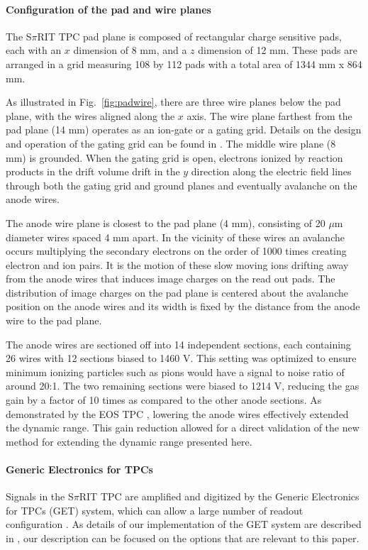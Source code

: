 \documentclass[review]{elsarticle}
\begin{document}
\paragraph{Configuration of the pad and wire planes} 
The S$\pi$RIT TPC pad plane is composed of rectangular charge sensitive pads, each with an $x$ dimension of 8 mm, and a $z$ dimension of 12 mm. These pads are arranged in a grid measuring 108 by 112 pads with a total area of 1344 mm x 864 mm.

As illustrated in Fig.~\ref{fig:padwire}, there are three wire planes below the pad plane, with the wires aligned along the $x$ axis. The wire plane farthest from the pad plane (14 mm) operates as an ion-gate or a gating grid. Details on the design and operation of the gating grid can be found in \cite{suwat}. The middle wire plane (8~ mm) is grounded. When the gating grid is open, electrons ionized by reaction products in the drift volume drift in the $y$ direction along the electric field lines through both the gating grid and ground planes and eventually avalanche on the anode wires. 

The anode wire plane is closest to the pad plane (4 mm), consisting of 20 $\mu$m diameter wires spaced 4 mm apart. In the vicinity of these wires an avalanche occurs multiplying the secondary electrons on the order of 1000 times creating electron and ion pairs. It is the motion of these slow moving ions drifting away from the anode wires that induces image charges on the read out pads. The distribution of image charges on the pad plane is centered about the avalanche position on the anode wires and its width is fixed by the distance from the anode wire to the pad plane. 

The anode wires are sectioned off into 14 independent sections, each containing 26 wires with 12 sections biased to 1460 V. This setting was optimized to ensure minimum ionizing particles such as pions would have a signal to noise ratio of around 20:1. The two remaining sections were biased to 1214 V, reducing the gas gain by a factor of 10 times as compared to the other anode sections. As demonstrated by the EOS TPC \citep{eos}, lowering the anode wires effectively extended the dynamic range.  This gain reduction allowed for a direct validation of the new method for extending the dynamic range presented here. 

\paragraph{Generic Electronics for TPCs}
Signals in the S$\pi$RIT TPC are amplified and digitized by the Generic Electronics for TPCs (GET) system, which can allow a large number of readout configuration \cite{get}. As details of our implementation of the GET system are described in \citep{aki}, our description can be focused on the options that are relevant to this paper.
\end{document}
